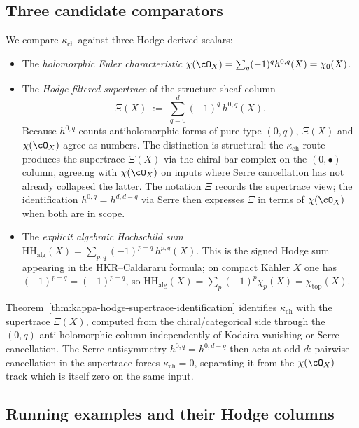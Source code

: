 \subsection{Three candidate comparators}
\label{subsec:cy-strat-three-candidates}

We compare $\kappa_{\mathrm{ch}}$ against three Hodge-derived scalars:

\begin{itemize}
\item The \emph{holomorphic Euler characteristic}
$\chi(\cO_X) = \sum_q (-1)^q h^{0,q}(X) = \chi_0(X)$.
\item The \emph{Hodge-filtered supertrace} of the structure sheaf column
\[
 \Xi(X) \;:=\; \sum_{q = 0}^{d} (-1)^q\, h^{0,q}(X).
\]
Because $h^{0,q}$ counts antiholomorphic forms of pure type $(0,q)$,
$\Xi(X)$ and $\chi(\cO_X)$ agree as numbers. The distinction is
structural: the $\kappa_{\mathrm{ch}}$ route produces the supertrace
$\Xi(X)$ via the chiral bar complex on the $(0, \bullet)$ column,
agreeing with $\chi(\cO_X)$ on inputs where Serre cancellation has
not already collapsed the latter. The notation $\Xi$ records the
supertrace view; the identification $h^{0, q} = h^{d, d-q}$ via
Serre then expresses $\Xi$ in terms of $\chi(\cO_X)$ when both are
in scope.
\item The \emph{explicit algebraic Hochschild sum}
$\mathrm{HH}_{\mathrm{alg}}(X) = \sum_{p,q} (-1)^{p - q}\, h^{p,q}(X)$.
This is the signed Hodge sum appearing in the HKR--Caldararu formula;
on compact K\"ahler $X$ one has $(-1)^{p-q} = (-1)^{p+q}$, so
$\mathrm{HH}_{\mathrm{alg}}(X) = \sum_p (-1)^p \chi_p(X) = \chi_{\mathrm{top}}(X)$.
\end{itemize}

Theorem~\ref{thm:kappa-hodge-supertrace-identification} identifies
$\kappa_{\mathrm{ch}}$ with the supertrace $\Xi(X)$, computed from
the chiral/categorical side through the $(0, q)$ anti-holomorphic
column independently of Kodaira vanishing or Serre cancellation. The
Serre antisymmetry $h^{0, q} = h^{0, d-q}$ then acts at odd $d$:
pairwise cancellation in the supertrace forces
$\kappa_{\mathrm{ch}} = 0$, separating it from the
$\chi(\cO_X)$-track which is itself zero on the same input.

\subsection{Running examples and their Hodge columns}
\label{subsec:cy-strat-examples}

